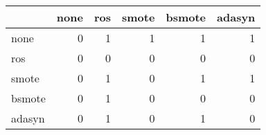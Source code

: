 \begin{tabular}{lrrrrr}
\hline
        &   none &   ros &   smote &   bsmote &   adasyn \\
\hline
 none   &      0 &     1 &       1 &        1 &        1 \\
 ros    &      0 &     0 &       0 &        0 &        0 \\
 smote  &      0 &     1 &       0 &        1 &        1 \\
 bsmote &      0 &     1 &       0 &        0 &        0 \\
 adasyn &      0 &     1 &       0 &        1 &        0 \\
\hline
\end{tabular}